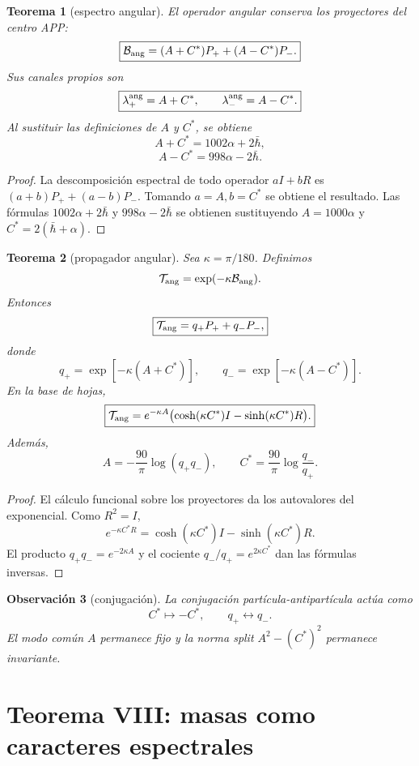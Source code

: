 \documentclass[11pt,a4paper]{article}
\newtheorem{teorema}{Teorema}
\newtheorem{observacion}[teorema]{Observaci\'on}
\newcommand{\Bang}{\mathcal B_{\rm ang}}
\newcommand{\Tang}{\mathcal T_{\rm ang}}
\newcommand{\hbarbar}{\bar\hbar}
\begin{document}
\begin{teorema}[espectro angular]
El operador angular conserva los proyectores del centro APP:
\[
\boxed{\Bang=(A+C^\ast)P_+ +(A-C^\ast)P_-.}
\]
Sus canales propios son
\[
\boxed{\lambda_+^{\rm ang}=A+C^\ast,\qquad \lambda_-^{\rm ang}=A-C^\ast.}
\]
Al sustituir las definiciones de \(A\) y \(C^\ast\), se obtiene
\[
\boxed{A+C^\ast=1002\alpha+2\hbarbar,}
\]
\[
\boxed{A-C^\ast=998\alpha-2\hbarbar.}
\]
\end{teorema}

\begin{proof}
La descomposici\'on espectral de todo operador \(aI+bR\) es \((a+b)P_+ +(a-b)P_-\). Tomando \(a=A,b=C^\ast\) se obtiene el resultado. Las f\'ormulas \(1002\alpha+2\hbarbar\) y \(998\alpha-2\hbarbar\) se obtienen sustituyendo \(A=1000\alpha\) y \(C^\ast=2(\hbarbar+\alpha)\).
\end{proof}

\begin{teorema}[propagador angular]
Sea \(\kappa=\pi/180\). Definimos
\[
\Tang=\exp(-\kappa\Bang).
\]
Entonces
\[
\boxed{\Tang=q_+P_+ +q_-P_-,}
\]
donde
\[
\boxed{q_+=\exp[-\kappa(A+C^\ast)],\qquad q_- =\exp[-\kappa(A-C^\ast)].}
\]
En la base de hojas,
\[
\boxed{\Tang=e^{-\kappa A}\bigl(\cosh(\kappa C^\ast)I-\sinh(\kappa C^\ast)R\bigr).}
\]
Adem\'as,
\[
\boxed{A=-\frac{90}{\pi}\log(q_+q_-),\qquad C^\ast=\frac{90}{\pi}\log\frac{q_-}{q_+}.}
\]
\end{teorema}

\begin{proof}
El c\'alculo funcional sobre los proyectores da los autovalores del exponencial. Como \(R^2=I\),
\[
e^{-\kappa C^\ast R}=\cosh(\kappa C^\ast)I-\sinh(\kappa C^\ast)R.
\]
El producto \(q_+q_-=e^{-2\kappa A}\) y el cociente \(q_-/q_+=e^{2\kappa C^\ast}\) dan las f\'ormulas inversas.
\end{proof}

\begin{observacion}[conjugaci\'on]
La conjugaci\'on part\'icula-antipart\'icula act\'ua como
\[
C^\ast\mapsto-C^\ast,
\qquad
q_+\leftrightarrow q_-.
\]
El modo com\'un \(A\) permanece fijo y la norma split \(A^2-(C^\ast)^2\) permanece invariante.
\end{observacion}

\section{Teorema VIII: masas como caracteres espectrales}
\end{document}
